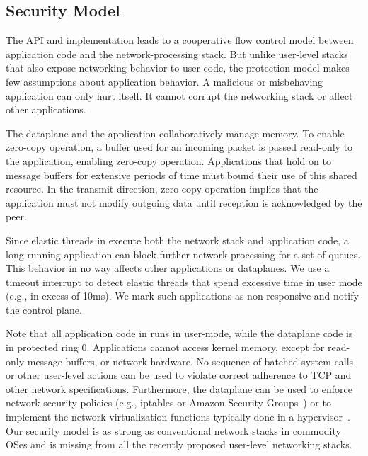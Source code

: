 \subsection{Security Model}
\label{sec:impl:coop}


The \ix API and implementation leads to a cooperative flow control
model between application code and the network-processing stack.  But
unlike user-level stacks that also expose networking behavior to user
code,
the \ix protection model makes few assumptions about application
behavior. A malicious or misbehaving application can only hurt
itself. It cannot corrupt the networking stack or affect other
applications.

The \ix dataplane and the application collaboratively manage
memory. To enable zero-copy operation, a buffer used for an incoming
packet is passed read-only to the application, enabling zero-copy
operation. Applications that hold on to message buffers for extensive
periods of time must bound their use of this shared resource.  In the
transmit direction, zero-copy operation implies that the application
must not modify outgoing data
until reception is
acknowledged by the peer. %

Since elastic threads in \ix execute both the network stack and
application code, a long running application can block further network
processing for a set of queues. This behavior in no way affects other
applications or dataplanes. We use a timeout interrupt to
detect elastic threads that spend excessive time in user mode (e.g.,
in excess of 10ms). We mark such applications as non-responsive and notify
the control plane. %

Note that all application code in \ix runs in user-mode, while the
dataplane code is in protected ring 0. Applications cannot access
kernel memory, except for read-only message buffers, or network
hardware.  No sequence of batched system calls or other user-level
actions can be used to violate correct adherence to TCP and other
network specifications.  Furthermore, the dataplane can be used to
enforce network security policies (e.g., iptables or Amazon Security
Groups~\cite{url:amazon-sg}) or to implement the network virtualization functions typically
done in a hypervisor~\cite{nsdi:nsx}. Our security model is as strong
as conventional network stacks in commodity OSes and is missing from all
the recently proposed user-level networking stacks.

